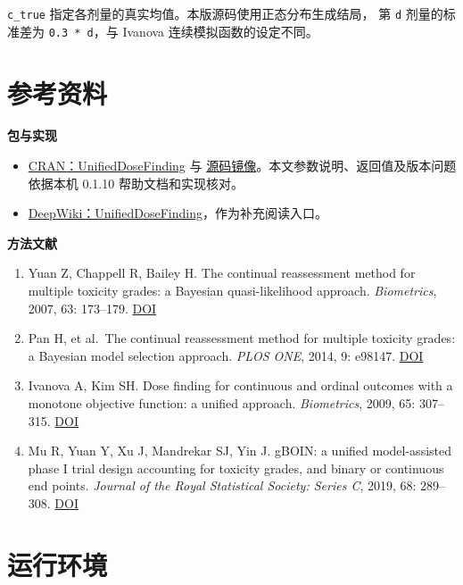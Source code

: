 \documentclass[
  chinese,
]{article}
\providecommand{\tightlist}{%
  \setlength{\itemsep}{0pt}\setlength{\parskip}{0pt}}
\begin{document}
\texttt{c\_true} 指定各剂量的真实均值。本版源码使用正态分布生成结局， 第
\texttt{d} 剂量的标准差为 \texttt{0.3\ *\ d}，与 Ivanova
连续模拟函数的设定不同。

\section{参考资料}\label{ux53c2ux8003ux8d44ux6599}

\textbf{包与实现}

\begin{itemize}
\tightlist
\item
  \href{https://cran.r-project.org/package=UnifiedDoseFinding}{CRAN：UnifiedDoseFinding}
  与
  \href{https://github.com/cran/UnifiedDoseFinding}{源码镜像}。本文参数说明、返回值及版本问题依据本机
  0.1.10 帮助文档和实现核对。
\item
  \href{https://deepwiki.com/cran/UnifiedDoseFinding}{DeepWiki：UnifiedDoseFinding}，作为补充阅读入口。
\end{itemize}

\textbf{方法文献}

\begin{enumerate}
\def\labelenumi{\arabic{enumi}.}
\tightlist
\item
  Yuan Z, Chappell R, Bailey H. The continual reassessment method for
  multiple toxicity grades: a Bayesian quasi-likelihood approach.
  \emph{Biometrics}, 2007, 63: 173--179.
  \href{https://doi.org/10.1111/j.1541-0420.2006.00666.x}{DOI}
\item
  Pan H, et al.~The continual reassessment method for multiple toxicity
  grades: a Bayesian model selection approach. \emph{PLOS ONE}, 2014, 9:
  e98147. \href{https://doi.org/10.1371/journal.pone.0098147}{DOI}
\item
  Ivanova A, Kim SH. Dose finding for continuous and ordinal outcomes
  with a monotone objective function: a unified approach.
  \emph{Biometrics}, 2009, 65: 307--315.
  \href{https://doi.org/10.1111/j.1541-0420.2008.01045.x}{DOI}
\item
  Mu R, Yuan Y, Xu J, Mandrekar SJ, Yin J. gBOIN: a unified
  model-assisted phase I trial design accounting for toxicity grades,
  and binary or continuous end points. \emph{Journal of the Royal
  Statistical Society: Series C}, 2019, 68: 289--308.
  \href{https://doi.org/10.1111/rssc.12263}{DOI}
\end{enumerate}

\section{运行环境}\label{ux8fd0ux884cux73afux5883}
\end{document}
